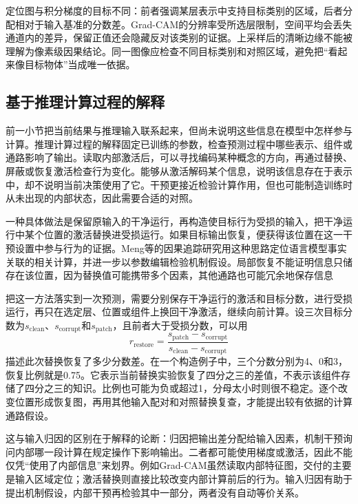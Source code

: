 定位图与积分梯度的目标不同：前者强调某层表示中支持目标类别的区域，后者分配相对于输入基准的分数差。Grad-CAM的分辨率受所选层限制，空间平均会丢失通道内的差异，保留正值还会隐藏反对该类别的证据。上采样后的清晰边缘不能被理解为像素级因果结论。同一图像应检查不同目标类别和对照区域，避免把“看起来像目标物体”当成唯一依据。

\subsection{基于推理计算过程的解释}
\label{sec:interpretability-local-mechanism}

前一小节把当前结果与推理输入联系起来，但尚未说明这些信息在模型中怎样参与计算。推理计算过程的解释固定已训练的参数，检查预测过程中哪些表示、组件或通路影响了输出。读取内部激活后，可以寻找编码某种概念的方向，再通过替换、屏蔽或恢复激活检查行为变化。能够从激活解码某个信息，说明该信息存在于表示中，却不说明当前决策使用了它。干预更接近检验计算作用，但也可能制造训练时从未出现的内部状态，因此需要合适的对照。

一种具体做法是保留原输入的干净运行，再构造使目标行为受损的输入，把干净运行中某个位置的激活替换进受损运行。如果目标输出恢复，便获得该位置在这一干预设置中参与行为的证据。Meng等的因果追踪研究用这种思路定位语言模型事实关联的相关计算，并进一步以参数编辑检验机制假设。局部恢复不能证明信息只储存在该位置，因为替换值可能携带多个因素，其他通路也可能冗余地保存信息

把这一方法落实到一次预测，需要分别保存干净运行的激活和目标分数，进行受损运行，再只在选定层、位置或组件上换回干净激活，继续向前计算。设三次目标分数为$s_{\mathrm{clean}}$、$s_{\mathrm{corrupt}}$和$s_{\mathrm{patch}}$，且前者大于受损分数，可以用
\begin{equation}
 r_{\mathrm{restore}}
 =\frac{s_{\mathrm{patch}}-s_{\mathrm{corrupt}}}
        {s_{\mathrm{clean}}-s_{\mathrm{corrupt}}}
 \label{eq:interpretability-restoration}
\end{equation}
描述此次替换恢复了多少分数差。在一个构造例子中，三个分数分别为4、0和3，恢复比例就是0.75。它表示当前替换实验恢复了四分之三的差值，不表示该组件存储了四分之三的知识。比例也可能为负或超过1，分母太小时则很不稳定。逐个改变位置形成恢复图，再用其他输入配对和对照替换复查，才能提出较有依据的计算通路假设。

这与输入归因的区别在于解释的论断：归因把输出差分配给输入因素，机制干预询问内部哪一段计算在规定操作下影响输出。二者都可能使用梯度或激活，因此不能仅凭“使用了内部信息”来划界。例如Grad-CAM虽然读取内部特征图，交付的主要是输入区域定位；激活替换则直接比较改变内部计算前后的行为。输入归因有助于提出机制假设，内部干预再检验其中一部分，两者没有自动等价关系。

